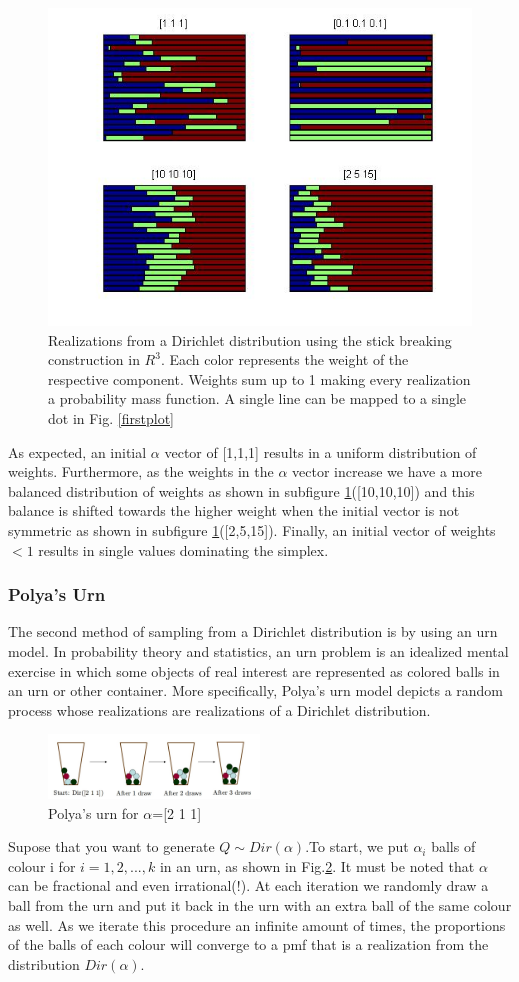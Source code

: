 \documentclass[twoside,hidelinks]{article}
\begin{document}
\begin{figure}[!h]
    \centerline{\includegraphics[width=.55\textwidth]{stickBreaking}}
    \caption{Realizations from a Dirichlet distribution using the stick breaking construction in $R^3$. Each color represents the weight of the respective component. Weights sum up to 1 making every realization a probability mass function. A single line can be mapped to a single dot in Fig. \ref{firstplot}  }
\label{stickR3}
\end{figure}


As expected, an initial $\alpha$ vector of [1,1,1] results in a uniform distribution of weights. Furthermore, as the weights in the $\alpha$ vector increase we have a more balanced distribution of weights as shown in subfigure \ref{stickR3}([10,10,10]) and this balance is shifted towards the higher weight when the initial vector is not symmetric as shown in subfigure \ref{stickR3}([2,5,15]). Finally, an initial vector of weights $<1$ results in single values dominating the simplex.
\subsubsection{Polya's Urn}

The second method of sampling from a Dirichlet distribution is by using an urn model. In probability theory and statistics, an urn problem is an idealized mental exercise in which some objects of real interest are represented as colored balls in an urn or other container. More specifically, Polya's urn model depicts a random process whose realizations are realizations of a Dirichlet distribution.

\begin{figure}[!h]
    \centerline{\includegraphics[width=0.5\textwidth]{urn}}
	\caption{Polya's urn for $\alpha$=[2 1 1] }
	\label{polysurn}
\end{figure}
Supose that you want to generate $Q \sim Dir( \alpha ) $.To start, we put $\alpha_i$ balls of colour i for $i=1,2,...,k$ in an urn, as shown in Fig.\ref{polysurn}. It must be noted that $\alpha$ can be fractional and even irrational(!). At each iteration we randomly draw a ball from the urn and put it back in the urn with an extra ball of the same colour as well. As we iterate this procedure an infinite amount of times, the proportions of the balls of each colour will converge to a pmf that is a realization from the distribution $Dir(\alpha)$.
\end{document}
